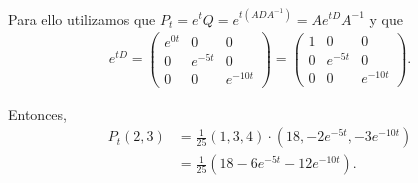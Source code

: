 Para ello utilizamos que $P_t = e^tQ = e^{t(ADA^{-1})} = Ae^{tD}A^{-1}$ y que
\begin{align}
    e^{tD}  =   
                \begin{pmatrix}
                    e^{0 t} &   0           &   0      \\
                    0       &   e^{-5 t}    &   0      \\
                    0       &   0           &   e^{-10 t}
                \end{pmatrix}
            =   
                \begin{pmatrix}
                    1       &   0           &   0      \\
                    0       &   e^{-5 t}    &   0      \\
                    0       &   0           &   e^{-10 t}
                \end{pmatrix}.
\end{align}

Entonces, 
\begin{align}
        P_t(2,3) &= \frac{1}{25} (1,3,4) \cdot (18, -2e^{-5t}, -3e^{-10t})                                                                                 \\
                 &= \frac{1}{25} (18 - 6e^{-5t} - 12e^{-10t}).                                                                                                \\
\end{align}
